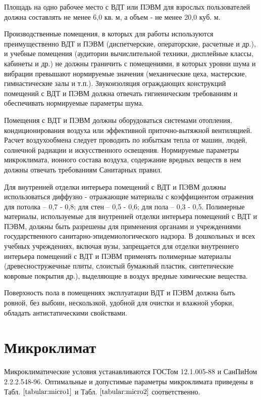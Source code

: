 \documentclass[12pt,a4paper]{report}
\begin{document}
Площадь на одно рабочее место с ВДТ или ПЭВМ для взрослых пользователей должна составлять не менее 6,0 кв. м, а объем - не менее 20,0 куб. м. 

Производственные помещения, в которых для работы используются преимущественно ВДТ и ПЭВМ (диспетчерские, операторские, расчетные и др.), и учебные помещения (аудитории вычислительной техники, дисплейные классы, кабинеты и др.) не должны граничить с помещениями, в которых уровни шума и вибрации превышают нормируемые значения (механические цеха, мастерские, гимнастические залы и т.п.). Звукоизоляция ограждающих конструкций помещений с ВДТ и ПЭВМ должна отвечать гигиеническим требованиям и обеспечивать нормируемые параметры шума.

Помещения с ВДТ и ПЭВМ должны оборудоваться системами отопления, кондиционирования воздуха или эффективной приточно-вытяжной вентиляцией. Расчет воздухообмена следует проводить по избыткам тепла от машин, людей, солнечной радиации и искусственного освещения. Нормируемые параметры микроклимата, ионного состава воздуха, содержание вредных веществ в нем должны отвечать требованиям Санитарных правил. 

Для внутренней отделки интерьера помещений с ВДТ и ПЭВМ должны использоваться диффузно - отражающие материалы с коэффициентом отражения для потолка – 0,7 - 0,8; для стен – 0,5 - 0,6; для пола – 0,3 - 0,5. Полимерные материалы, используемые для внутренней отделки интерьера помещений с ВДТ и ПЭВМ, должны быть разрешены для применения органами и учреждениями государственного санитарно-эпидемиологического надзора. В дошкольных и всех учебных учреждениях, включая вузы, запрещается для отделки внутреннего интерьера помещений с ВДТ и ПЭВМ применять полимерные материалы (древесностружечные плиты, слоистый бумажный пластик, синтетические ковровые покрытия др.), выделяющие в воздух вредные химические вещества. 

Поверхность пола в помещениях эксплуатации ВДТ и ПЭВМ должна быть ровной, без выбоин, нескользкой, удобной для очистки и влажной уборки, обладать антистатическими свойствами.

\section{Микроклимат}
Микроклиматические условия устанавливаются ГОСТом 12.1.005-88 и СанПиНом 2.2.2.548-96. Оптимальные и допустимые параметры микроклимата приведены в Табл. $\ref{tabular:micro1}$ и Табл. $\ref{tabular:micro2}$ соответственно.
\end{document}
